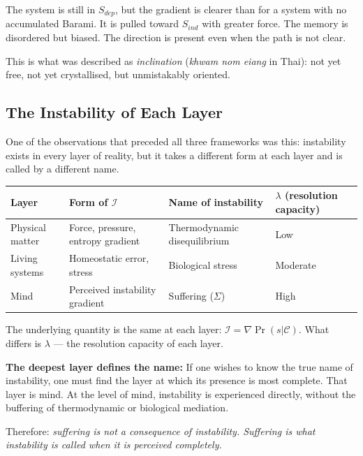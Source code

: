 \documentclass[12pt, a4paper]{article}
\begin{document}
The system is still in $S_{dep}$, but the gradient is clearer than for a system
with no accumulated Barami. It is pulled toward $S_{ind}$ with greater force.
The memory is disordered but biased. The direction is present even when
the path is not clear.

This is what was described as \textit{inclination} (\textit{khwam nom eiang}
in Thai): not yet free, not yet crystallised, but unmistakably oriented.

\subsection*{The Instability of Each Layer}

One of the observations that preceded all three frameworks was this: instability
exists in every layer of reality, but it takes a different form at each layer
and is called by a different name.

\begin{keybox}[title={Instability Across Layers}]
\begin{center}
\renewcommand{\arraystretch}{1.5}
\begin{tabular}{p{2.5cm} p{3.5cm} p{3.5cm} p{2.2cm}}
\toprule
\textbf{Layer} & \textbf{Form of $\mathcal{I}$} & \textbf{Name of instability} & \textbf{$\lambda$ (resolution capacity)} \\
\midrule
Physical matter & Force, pressure, entropy gradient & Thermodynamic disequilibrium & Low \\
Living systems & Homeostatic error, stress & Biological stress & Moderate \\
Mind & Perceived instability gradient & Suffering ($\Sigma$) & High \\
\bottomrule
\end{tabular}
\end{center}

The underlying quantity is the same at each layer: $\mathcal{I} = \nabla\Pr(s|\mathcal{C})$.
What differs is $\lambda$ --- the resolution capacity of each layer.

\textbf{The deepest layer defines the name:}
If one wishes to know the true name of instability, one must find the layer
at which its presence is most complete. That layer is mind. At the level of
mind, instability is experienced directly, without the buffering of
thermodynamic or biological mediation.

Therefore: \textit{suffering is not a consequence of instability.
Suffering is what instability is called when it is perceived completely.}
\end{keybox}
\end{document}
